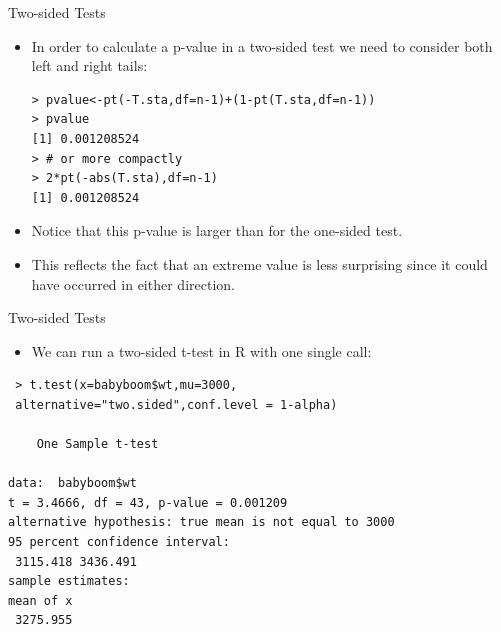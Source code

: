 \documentclass[handout]{beamer}
\begin{document}
\begin{frame}[fragile]{Two-sided Tests}
\scriptsize{
\begin{itemize}

\item In order to calculate a p-value in a two-sided test we need to consider both left and right tails:

\begin{verbatim}
> pvalue<-pt(-T.sta,df=n-1)+(1-pt(T.sta,df=n-1))
> pvalue
[1] 0.001208524
> # or more compactly
> 2*pt(-abs(T.sta),df=n-1)
[1] 0.001208524
\end{verbatim}

\item Notice that this p-value is larger than for the one-sided test.

\item This reflects the fact that an extreme value is less surprising since it could have occurred in either direction.
\end{itemize}

} 
\end{frame}


\begin{frame}[fragile]{Two-sided Tests}
\scriptsize{
\begin{itemize}

\item We can run a two-sided t-test in R with one single call:
\end{itemize}

\begin{verbatim}
 > t.test(x=babyboom$wt,mu=3000,
 alternative="two.sided",conf.level = 1-alpha)

	One Sample t-test

data:  babyboom$wt
t = 3.4666, df = 43, p-value = 0.001209
alternative hypothesis: true mean is not equal to 3000
95 percent confidence interval:
 3115.418 3436.491
sample estimates:
mean of x 
 3275.955 
\end{verbatim}



} 
\end{frame}
\end{document}
